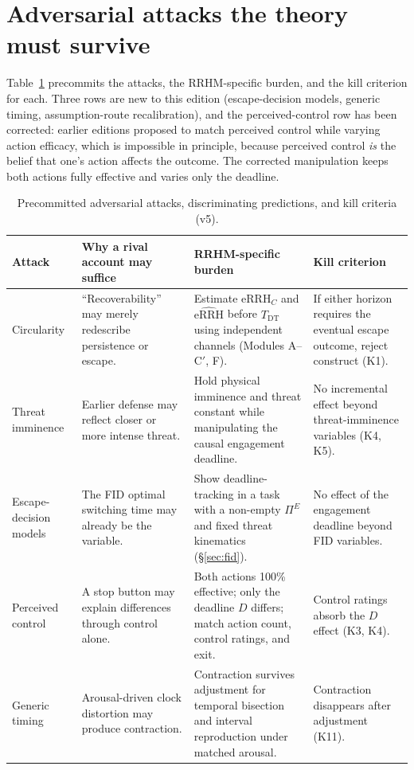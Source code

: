 \documentclass[9pt,twocolumn]{article}
\newcommand{\eRRHc}{\mathrm{eRRH}_{C}}
\newcommand{\eRRHhat}{\widehat{\mathrm{eRRH}}}
\newcommand{\Tdt}{T_{\mathrm{DT}}}
\begin{document}
\section{Adversarial attacks the theory must survive}
Table~\ref{tab:attacks} precommits the attacks, the RRHM-specific burden, and the kill criterion for each. Three rows are new to this edition (escape-decision models, generic timing, assumption-route recalibration), and the perceived-control row has been corrected: earlier editions proposed to match perceived control while varying action efficacy, which is impossible in principle, because perceived control \emph{is} the belief that one's action affects the outcome. The corrected manipulation keeps both actions fully effective and varies only the deadline.

\begin{table}[!t]
\centering
\caption{Precommitted adversarial attacks, discriminating predictions, and kill criteria (v5).}
\label{tab:attacks}
\small
\begin{tabularx}{\textwidth}{p{}X X p{}}
\toprule
\textbf{Attack} & \textbf{Why a rival account may suffice} & \textbf{RRHM-specific burden} & \textbf{Kill criterion} \\
\midrule
Circularity & ``Recoverability'' may merely redescribe persistence or escape. & Estimate $\eRRHc$ and $\eRRHhat$ before $\Tdt$ using independent channels (Modules A--C$'$, F). & If either horizon requires the eventual escape outcome, reject construct (K1). \\
Threat imminence & Earlier defense may reflect closer or more intense threat. & Hold physical imminence and threat constant while manipulating the causal engagement deadline. & No incremental effect beyond threat-imminence variables (K4, K5). \\
Escape-decision models & The FID optimal switching time may already be the variable. & Show deadline-tracking in a task with a non-empty $\Pi^E$ and fixed threat kinematics (\S\ref{sec:fid}). & No effect of the engagement deadline beyond FID variables. \\
Perceived control & A stop button may explain differences through control alone. & Both actions 100\% effective; only the deadline $D$ differs; match action count, control ratings, and exit. & Control ratings absorb the $D$ effect (K3, K4). \\
Generic timing & Arousal-driven clock distortion may produce contraction. & Contraction survives adjustment for temporal bisection and interval reproduction under matched arousal. & Contraction disappears after adjustment (K11). \\

\end{tabularx}
\end{table}
\end{document}
